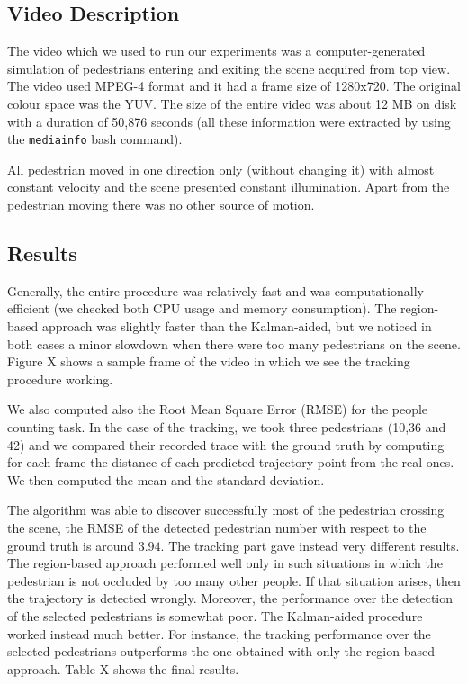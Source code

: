 \documentclass[runningheads]{llncs}
\begin{document}
\subsection{Video Description}

The video which we used to run our experiments was a computer-generated simulation of pedestrians entering and exiting the scene acquired from top view. The video used MPEG-4 format and it had a frame size of 1280x720. The original colour space was the YUV. The size of the entire video was about 12 MB on disk with a duration of 50,876 seconds (all these information were extracted by using the \texttt{mediainfo} bash command).

All pedestrian moved in one direction only (without changing it) with almost constant velocity and the scene presented constant illumination. Apart from the pedestrian moving there was no other source of motion. 

\subsection{Results}
Generally, the entire procedure was relatively fast and was computationally efficient (we checked both CPU usage and memory consumption). The region-based approach was slightly faster than the Kalman-aided, but we noticed in both cases a minor slowdown when there were too many pedestrians on the scene. Figure X shows a sample frame of the video in which we see the tracking procedure working.

We also computed also the Root Mean Square Error (RMSE) for the people counting task. In the case of the tracking, we took three pedestrians (10,36 and 42) and we compared their recorded trace with the ground truth by computing for each frame the distance of each predicted trajectory point from the real ones. We then computed the mean and the standard deviation.

The algorithm was able to discover successfully most of the pedestrian crossing the scene, the RMSE of the detected pedestrian number with respect to the ground truth is around $3.94$. 
The tracking part gave instead very different results. The region-based approach performed well only in such situations in which the pedestrian is not occluded by too many other people. If that situation arises, then the trajectory is detected wrongly. Moreover, the performance over the detection of the selected pedestrians is somewhat poor. 
The Kalman-aided procedure worked instead much better. For instance, the tracking performance over the selected pedestrians outperforms the one obtained with only the region-based approach. Table X shows the final results.
\end{document}
